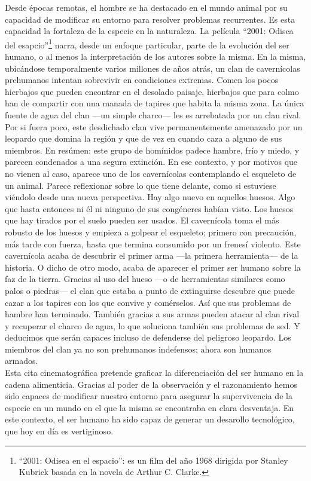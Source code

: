 Desde épocas remotas, el hombre se ha destacado en el mundo animal por su
capacidad de modificar su entorno para resolver problemas recurrentes. Es esta
capacidad la fortaleza de la especie en la naturaleza. La película ``2001:
Odisea del esapcio''\footnote{``2001: Odisea en el espacio'': es un film del año
1968 dirigida por Stanley Kubrick basada en la novela de Arthur C. Clarke.}
narra, desde un enfoque particular, parte de la evolución del ser humano, o al
menos la interpretación de los autores sobre la misma. En la misma, ubicándose
temporalmente varios millones de años atrás, un clan de cavernícolas prehumanos
intentan sobrevivir en condiciones extremas. Comen los pocos hierbajos que
pueden encontrar en el desolado paisaje, hierbajos que para colmo han de
compartir con una manada de tapires que habita la misma zona. La única fuente de
agua del clan —un simple charco— les es arrebatada por un clan rival. Por si
fuera poco, este desdichado clan vive permanentemente amenazado por un leopardo
que domina la región y que de vez en cuando caza a alguno de sus miembros. En
resúmen: este grupo de homínidos padece hambre, frío y miedo, y parecen
condenados a una segura extinción. En ese contexto, y por motivos que no vienen
al caso, aparece uno de los cavernícolas contemplando el esqueleto de un animal.
Parece reflexionar sobre lo que tiene delante, como si estuviese viéndolo desde
una nueva perspectiva. Hay algo nuevo en aquellos huesos. Algo que hasta
entonces ni él ni ninguno de sus congéneres habían visto. Los huesos que hay
tirados por el suelo pueden ser usados. El cavernícola toma el más robusto de
los huesos y empieza a golpear el esqueleto; primero con precaución, más tarde
con fuerza, hasta que termina consumido por un frenesí violento. Este
cavernícola acaba de descubrir el primer arma —la primera herramienta— de la
historia. O dicho de otro modo, acaba de aparecer el primer ser humano sobre la
faz de la tierra. Gracias al uso del hueso —o de herramientas similares como
palos o piedras— el clan que estaba a punto de extinguirse descubre que puede
cazar a los tapires con los que convive y comérselos. Así que sus problemas de
hambre han terminado. También gracias a sus armas pueden atacar al clan rival y
recuperar el charco de agua, lo que soluciona también sus problemas de sed. Y
deducimos que serán capaces incluso de defenderse del peligroso leopardo. Los
miembros del clan ya no son prehumanos indefensos; ahora son humanos armados.\\
Esta cita cinematográfica pretende graficar la diferenciación del ser humano en
la cadena alimenticia. Gracias al poder de la observación y el razonamiento
hemos sido capaces de modificar nuestro entorno para asegurar la supervivencia
de la especie en un mundo en el que la misma se encontraba en clara desventaja.
En este contexto, el ser humano ha sido capaz de generar un desarollo
tecnológico, que hoy en día es vertiginoso.\\

